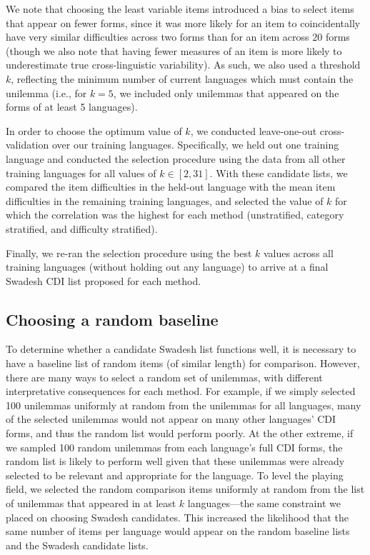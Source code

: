 \documentclass[
  letterpaper,
  DIV=11,
  numbers=noendperiod]{scrartcl}
\begin{document}
We note that choosing the least variable items introduced a bias to
select items that appear on fewer forms, since it was more likely for an
item to coincidentally have very similar difficulties across two forms
than for an item across 20 forms (though we also note that having fewer
measures of an item is more likely to underestimate true
cross-linguistic variability). As such, we also used a threshold \(k\),
reflecting the minimum number of current languages which must contain
the unilemma (i.e., for \(k = 5\), we included only unilemmas that
appeared on the forms of at least 5 languages).

In order to choose the optimum value of \(k\), we conducted
leave-one-out cross-validation over our training languages.
Specifically, we held out one training language and conducted the
selection procedure using the data from all other training languages for
all values of \(k \in [2, 31]\). With these candidate lists, we compared
the item difficulties in the held-out language with the mean item
difficulties in the remaining training languages, and selected the value
of \(k\) for which the correlation was the highest for each method
(unstratified, category stratified, and difficulty stratified).

Finally, we re-ran the selection procedure using the best \(k\) values
across all training languages (without holding out any language) to
arrive at a final Swadesh CDI list proposed for each method.

\subsection{Choosing a random
baseline}\label{choosing-a-random-baseline}

To determine whether a candidate Swadesh list functions well, it is
necessary to have a baseline list of random items (of similar length)
for comparison. However, there are many ways to select a random set of
unilemmas, with different interpretative consequences for each method.
For example, if we simply selected 100 unilemmas uniformly at random
from the unilemmas for all languages, many of the selected unilemmas
would not appear on many other languages' CDI forms, and thus the random
list would perform poorly. At the other extreme, if we sampled 100
random unilemmas from each language's full CDI forms, the random list is
likely to perform well given that these unilemmas were already selected
to be relevant and appropriate for the language. To level the playing
field, we selected the random comparison items uniformly at random from
the list of unilemmas that appeared in at least \(k\) languages---the
same constraint we placed on choosing Swadesh candidates. This increased
the likelihood that the same number of items per language would appear
on the random baseline lists and the Swadesh candidate lists.
\end{document}
